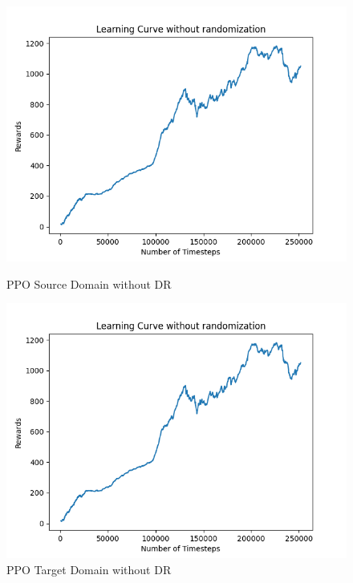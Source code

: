 \documentclass[11pt]{article}
\begin{document}
\begin{figure}[H]
    \vfill
    \begin{minipage}{0.45\textwidth}
        \centering
        \includegraphics[width=\textwidth]{../images/Learning_Curve_PPO_no_rand_Source.png}
        \caption{PPO Source Domain without DR}
        \label{fig:ppo_source_no_dr}
    \end{minipage}
    \hfill
    \begin{minipage}{0.45\textwidth}
        \centering
        \includegraphics[width=\textwidth]{../images/Learning_Curve_PPO_no_rand_Source.png}
        \caption{PPO Target Domain without DR}
        \label{fig:ppo_target_no_dr}
    \end{minipage}
\end{figure}
\end{document}
